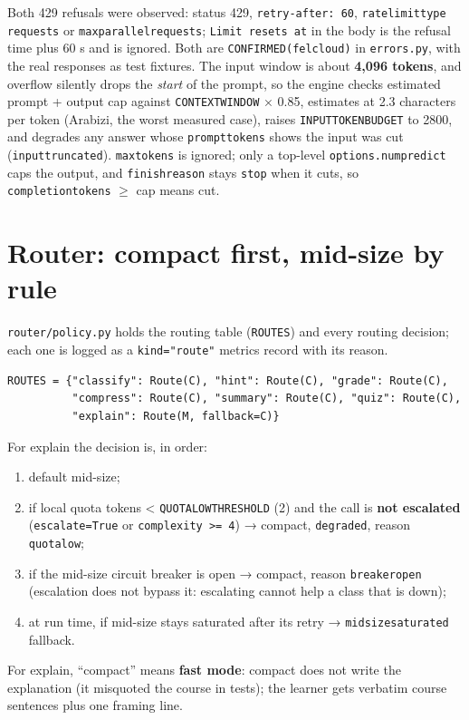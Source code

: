 \documentclass[11pt,a4paper]{article}
\renewcommand{\_}{\origus\allowbreak}
\begin{document}
\begin{note}
Both 429 refusals were observed: status 429, \texttt{retry-after: 60}, \texttt{rate\_limit\_type} \texttt{requests} or \texttt{max\_parallel\_requests}; \texttt{Limit resets at} in the body is the refusal time plus 60 s and is ignored. Both are \texttt{CONFIRMED(felcloud)} in \texttt{errors.py}, with the real responses as test fixtures. The input window is about \textbf{4,096 tokens}, and overflow silently drops the \emph{start} of the prompt, so the engine checks estimated prompt + output cap against \texttt{CONTEXT\_WINDOW} × 0.85, estimates at 2.3 characters per token (Arabizi, the worst measured case), raises \texttt{INPUT\_TOKEN\_BUDGET} to 2800, and degrades any answer whose \texttt{prompt\_tokens} shows the input was cut (\texttt{input\_truncated}). \texttt{max\_tokens} is ignored; only a top-level \texttt{options.num\_predict} caps the output, and \texttt{finish\_reason} stays \texttt{stop} when it cuts, so \texttt{completion\_tokens} $\ge$ cap means cut.
\end{note}

\section{Router: compact first, mid-size by rule}

\texttt{router/policy.py} holds the routing table (\texttt{ROUTES}) and every routing decision; each one is
logged as a \texttt{kind="route"} metrics record with its reason.

\begin{lstlisting}
ROUTES = {"classify": Route(C), "hint": Route(C), "grade": Route(C),
          "compress": Route(C), "summary": Route(C), "quiz": Route(C),
          "explain": Route(M, fallback=C)}
\end{lstlisting}

For explain the decision is, in order:
\begin{enumerate}
  \item default mid-size;
  \item if local quota tokens < \texttt{QUOTA\_LOW\_THRESHOLD} (2) and the call is \textbf{not escalated}
  (\texttt{escalate=True} or \texttt{complexity >= 4}) → compact, \texttt{degraded}, reason \texttt{quota\_low};
  \item if the mid-size circuit breaker is open → compact, reason \texttt{breaker\_open} (escalation does not
  bypass it: escalating cannot help a class that is down);
  \item at run time, if mid-size stays saturated after its retry → \texttt{midsize\_saturated} fallback.
\end{enumerate}
For explain, ``compact'' means \textbf{fast mode}: compact does not write the explanation (it misquoted
the course in tests); the learner gets verbatim course sentences plus one framing line.
\end{document}
